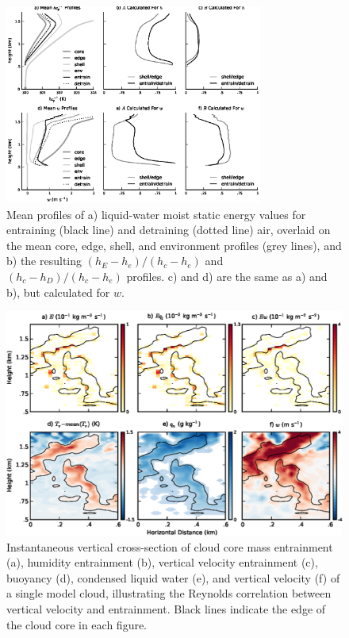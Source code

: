 \documentclass[draft,grl]{agutex}
\begin{document}
\begin{figure}
  \noindent\includegraphics[width=20pc]{./figures/profile_plots}
  \caption{Mean profiles of a) liquid-water moist static energy values for 
  entraining (black line) and detraining (dotted line) air, overlaid on the 
  mean core, edge, shell, and environment profiles (grey lines), and b) the 
  resulting $(h_E - h_e)/(h_c - h_e)$ and $(h_c - h_D)/(h_c - h_e)$ profiles.  
  c) and d) are the same as a) and b), but calculated for $w$. 
}
  \label{fig:profile_plots}
\end{figure}

\begin{figure}
  \noindent\includegraphics[width=39pc]{./figures/w_entrainment_example}
  \caption{Instantaneous vertical cross-section of cloud core mass entrainment 
  (a), humidity entrainment (b), vertical velocity entrainment (c), buoyancy 
  (d), condensed liquid water (e), and vertical velocity (f) of a single model
  cloud, illustrating the Reynolds correlation between vertical velocity and 
  entrainment.  Black lines indicate the edge of the cloud core in each figure.}
  \label{fig:w_entrainment_example}
\end{figure}
\end{document}
